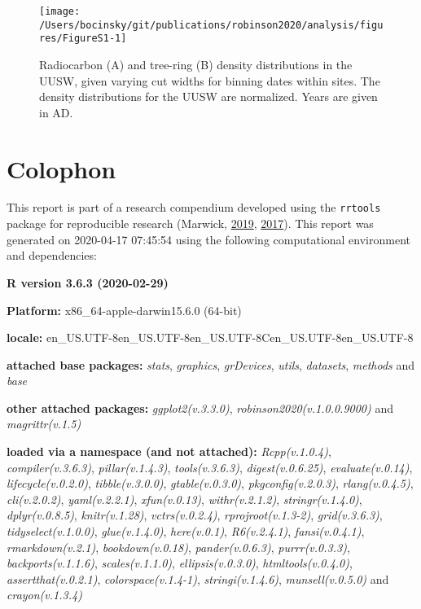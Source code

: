 \documentclass[
]{sa}
\begin{document}
\begin{figure}

{\centering \texttt{[image: /Users/bocinsky/git/publications/robinson2020/analysis/figures/FigureS1-1]} 

}

\caption{Radiocarbon (A) and tree-ring (B) density distributions in the UUSW, given varying cut widths for binning dates within sites. The density distributions for the UUSW are normalized. Years are given in AD.}\label{fig:FigureS1}
\end{figure}

\newpage

\hypertarget{colophon}{%
\section*{Colophon}\label{colophon}}

This report is part of a research compendium developed using the \texttt{rrtools} package for reproducible research (Marwick, \protect\hyperlink{ref-rrtools}{2019}, \protect\hyperlink{ref-Marwick2017}{2017}). This report was generated on 2020-04-17 07:45:54 using the following computational environment and dependencies:

\textbf{R version 3.6.3 (2020-02-29)}

\textbf{Platform:} x86\_64-apple-darwin15.6.0 (64-bit)

\textbf{locale:}
en\_US.UTF-8\textbar\textbar en\_US.UTF-8\textbar\textbar en\_US.UTF-8\textbar\textbar C\textbar\textbar en\_US.UTF-8\textbar\textbar en\_US.UTF-8

\textbf{attached base packages:}
\emph{stats}, \emph{graphics}, \emph{grDevices}, \emph{utils}, \emph{datasets}, \emph{methods} and \emph{base}

\textbf{other attached packages:}
\emph{ggplot2(v.3.3.0)}, \emph{robinson2020(v.1.0.0.9000)} and \emph{magrittr(v.1.5)}

\textbf{loaded via a namespace (and not attached):}
\emph{Rcpp(v.1.0.4)}, \emph{compiler(v.3.6.3)}, \emph{pillar(v.1.4.3)}, \emph{tools(v.3.6.3)}, \emph{digest(v.0.6.25)}, \emph{evaluate(v.0.14)}, \emph{lifecycle(v.0.2.0)}, \emph{tibble(v.3.0.0)}, \emph{gtable(v.0.3.0)}, \emph{pkgconfig(v.2.0.3)}, \emph{rlang(v.0.4.5)}, \emph{cli(v.2.0.2)}, \emph{yaml(v.2.2.1)}, \emph{xfun(v.0.13)}, \emph{withr(v.2.1.2)}, \emph{stringr(v.1.4.0)}, \emph{dplyr(v.0.8.5)}, \emph{knitr(v.1.28)}, \emph{vctrs(v.0.2.4)}, \emph{rprojroot(v.1.3-2)}, \emph{grid(v.3.6.3)}, \emph{tidyselect(v.1.0.0)}, \emph{glue(v.1.4.0)}, \emph{here(v.0.1)}, \emph{R6(v.2.4.1)}, \emph{fansi(v.0.4.1)}, \emph{rmarkdown(v.2.1)}, \emph{bookdown(v.0.18)}, \emph{pander(v.0.6.3)}, \emph{purrr(v.0.3.3)}, \emph{backports(v.1.1.6)}, \emph{scales(v.1.1.0)}, \emph{ellipsis(v.0.3.0)}, \emph{htmltools(v.0.4.0)}, \emph{assertthat(v.0.2.1)}, \emph{colorspace(v.1.4-1)}, \emph{stringi(v.1.4.6)}, \emph{munsell(v.0.5.0)} and \emph{crayon(v.1.3.4)}
\end{document}
